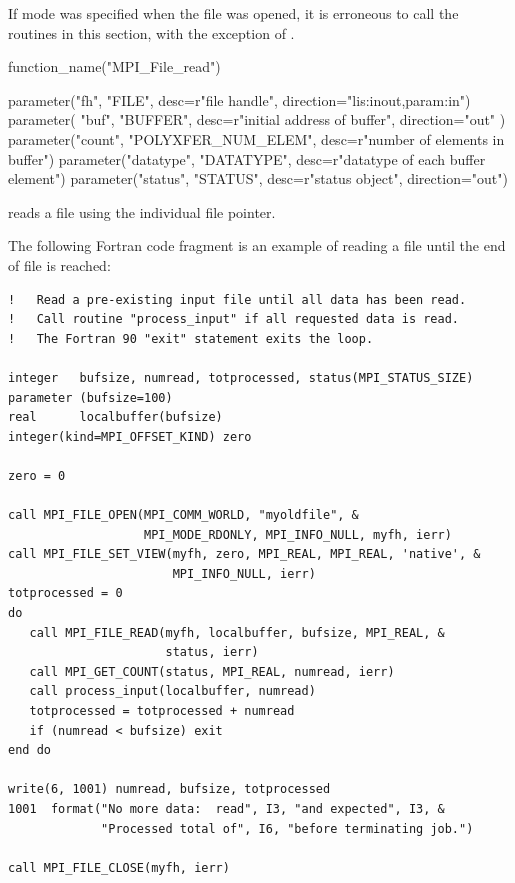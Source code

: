 If  mode was specified when the file
was opened, it is erroneous to call the routines in this 
section, with
the exception of .

%
%
\begin{mpi-binding}
    function_name("MPI_File_read")
    
    parameter("fh", "FILE", desc=r"file handle", direction="lis:inout,param:in")
    parameter(
        "buf", "BUFFER", desc=r"initial address of buffer", direction="out"
    )
    parameter("count", "POLYXFER_NUM_ELEM", desc=r"number of elements in buffer")
    parameter("datatype", "DATATYPE", desc=r"datatype of each buffer element")
    parameter("status", "STATUS", desc=r"status object", direction="out")
\end{mpi-binding}

 reads a file using the individual file pointer.

\begin{example}
\label{io-readtoend}
The following Fortran code fragment is an example of reading
a file until the end of file is reached:
\begin{lstlisting}[language={[MPI]Fortran}]
!   Read a pre-existing input file until all data has been read.
!   Call routine "process_input" if all requested data is read.
!   The Fortran 90 "exit" statement exits the loop.

integer   bufsize, numread, totprocessed, status(MPI_STATUS_SIZE)
parameter (bufsize=100)
real      localbuffer(bufsize)
integer(kind=MPI_OFFSET_KIND) zero

zero = 0

call MPI_FILE_OPEN(MPI_COMM_WORLD, "myoldfile", &
                   MPI_MODE_RDONLY, MPI_INFO_NULL, myfh, ierr)
call MPI_FILE_SET_VIEW(myfh, zero, MPI_REAL, MPI_REAL, 'native', &
                       MPI_INFO_NULL, ierr)
totprocessed = 0
do
   call MPI_FILE_READ(myfh, localbuffer, bufsize, MPI_REAL, &
                      status, ierr)
   call MPI_GET_COUNT(status, MPI_REAL, numread, ierr)
   call process_input(localbuffer, numread)
   totprocessed = totprocessed + numread
   if (numread < bufsize) exit
end do

write(6, 1001) numread, bufsize, totprocessed
1001  format("No more data:  read", I3, "and expected", I3, &
             "Processed total of", I6, "before terminating job.")

call MPI_FILE_CLOSE(myfh, ierr)
\end{lstlisting}
\end{example}

